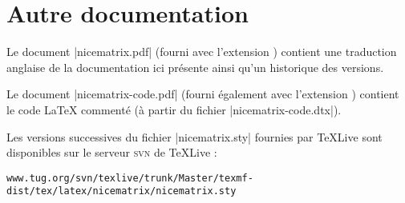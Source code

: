 \documentclass[dvipsnames]{article}%
\begin{document}
{}

\printindex

\section*{Autre documentation}

Le document |nicematrix.pdf| (fourni avec l'extension ) contient
une traduction anglaise de la documentation ici présente ainsi qu'un historique
des versions. 

Le document |nicematrix-code.pdf| (fourni également avec l'extension )
contient le code LaTeX commenté (à partir du fichier |nicematrix-code.dtx|).

\medskip
Les versions successives du fichier |nicematrix.sty| fournies par
TeXLive sont disponibles sur le serveur \textsc{svn} de TeXLive :

\smallskip
{
\small
\nolinkurl{www.tug.org/svn/texlive/trunk/Master/texmf-dist/tex/latex/nicematrix/nicematrix.sty}
}

\tableofcontents
\end{document}
